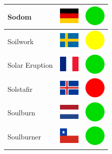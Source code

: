 \documentclass[12pt, a4paper, twoside]{report}
\begin{document}
\begin{center}
\begin{longtable}{|p{5cm}|p{2cm}|p{2cm}|}
 Sodom                                                      & \includegraphics[width=1cm]{../img/flags/de} &   \includegraphics[width=1cm]{../likes/y} \\ \hline
 Soilwork                                                   & \includegraphics[width=1cm]{../img/flags/se} &   \includegraphics[width=1cm]{../likes/m} \\ \hline
 Solar Eruption                                             & \includegraphics[width=1cm]{../img/flags/fr} &   \includegraphics[width=1cm]{../likes/y} \\ \hline
 Solstafir                                                  & \includegraphics[width=1cm]{../img/flags/is} &   \includegraphics[width=1cm]{../likes/n} \\ \hline
 Soulburn                                                   & \includegraphics[width=1cm]{../img/flags/nl} &   \includegraphics[width=1cm]{../likes/y} \\ \hline
 Soulburner                                                 & \includegraphics[width=1cm]{../img/flags/cl} &   \includegraphics[width=1cm]{../likes/y} \\ \hline

\end{longtable}
\end{center}
\end{document}
